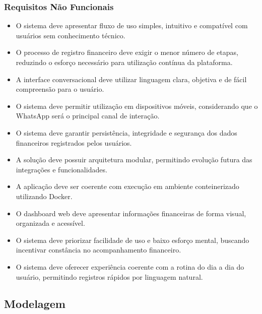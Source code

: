 \subsubsection{Requisitos Não Funcionais}

\begin{itemize}
    \item O sistema deve apresentar fluxo de uso simples, intuitivo e compatível com usuários sem conhecimento técnico.

    \item O processo de registro financeiro deve exigir o menor número de etapas, reduzindo o esforço necessário para utilização contínua da plataforma.

    \item A interface conversacional deve utilizar linguagem clara, objetiva e de fácil compreensão para o usuário.

    \item O sistema deve permitir utilização em dispositivos móveis, considerando que o WhatsApp será o principal canal de interação.

    \item O sistema deve garantir persistência, integridade e segurança dos dados financeiros registrados pelos usuários.

    \item A solução deve possuir arquitetura modular, permitindo evolução futura das integrações e funcionalidades.

    \item A aplicação deve ser coerente com execução em ambiente conteinerizado utilizando Docker.

    \item O dashboard web deve apresentar informações financeiras de forma visual, organizada e acessível.

    \item O sistema deve priorizar facilidade de uso e baixo esforço mental, buscando incentivar constância no acompanhamento financeiro.

    \item O sistema deve oferecer experiência coerente com a rotina do dia a dia do usuário, permitindo registros rápidos por linguagem natural.

\end{itemize}

\subsection{Modelagem}


